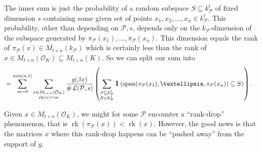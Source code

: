 \documentclass{amsart}
\newcommand{\vlad}{\color{brown}}
\DeclareMathOperator{\card}{\texttt{\#}}
\DeclareMathOperator{\rank}{rk}
\DeclareMathOperator{\spant}{span}
\DeclareMathOperator{\ind}{\mathlarger{\mathbf{1}}}
\DeclareMathOperator{\N}{N}
\begin{document}
The inner sum is just the probability of a random subspace $S \subseteq k_\mathcal{P}^{t}$ of fixed dimension $s$ containing some given set of points $x_1,x_2,\dots,x_n \in k_\mathcal{P}^{t}$. This probability, other than depending on $\mathcal{P},s$, depends only on the $k_\mathcal{P}$-dimension of the subspace generated by $\pi_\mathcal{P}(x_1),\dots,\pi_\mathcal{P}(x_n)$. This dimension equals the rank of $\pi_\mathcal{P}(x) \in M_{ t \times n }(k_\mathcal{P})$ which is certainly less than the rank of $x\in M_{t \times n}(\mathcal{O}_K) \subseteq M_{t \times n }(K)$. So we can split our sum into 
\begin{align}
& = 
\sum_{m=0}^{\min(n,t)}\sum_{\substack{x \in M_{t \times n }(\mathcal{O}_K) \\ \rank(x) = m}}
\frac{  g( \beta x)}{\card \mathcal{L}(\mathcal{P},s)} 
\left(
\sum_{\substack{  S \subseteq k_\mathcal{P}^{t} \\  S \simeq k_{\mathcal{P}}^{s} } } 
\ind\left(
\spant
( \pi_{\mathcal{P}}(x_1),\dots,\pi_{\mathcal{P}}(x_n)) \subseteq S
\right) \right). 
\label{eq:not_even_the_final_form}
\end{align}

Given $x \in M_{t \times n }(\mathcal{O}_K)$, we might for some $\mathcal{P}$ encounter a ``rank-drop'' phenomenon, that is $\rank\left(\pi_\mathcal{P}(x)\right) < \rank(x)$. However, the good news is that the matrices $x$ where this rank-drop happens can be ``pushed away'' from the support of $g$.
\end{document}
